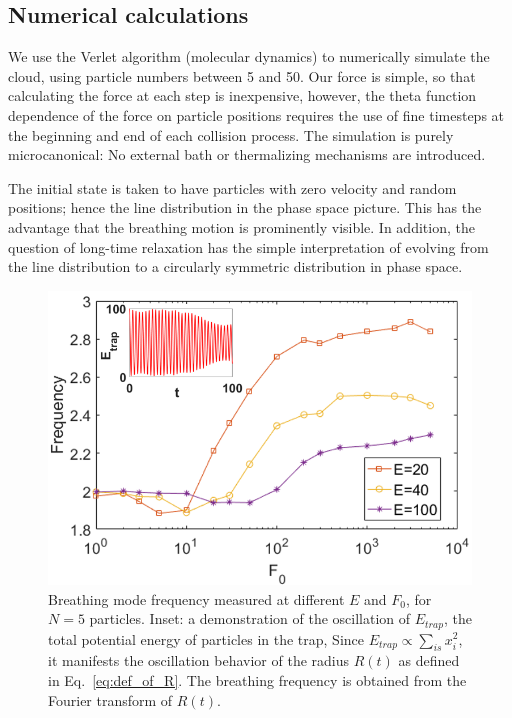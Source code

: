 \documentclass[a4paper, onecolumn]{revtex4-1}
\begin{document}
\subsection{Numerical calculations}

We use the Verlet algorithm (molecular dynamics) to numerically simulate the cloud, using particle
numbers between 5 and 50.  Our force is simple, so that calculating the force at each step is
inexpensive, however, the theta function dependence of the force on particle positions requires the
use of fine timesteps at the beginning and end of each collision process.  The simulation is purely
microcanonical: No external bath or thermalizing mechanisms are introduced. 

The initial state is taken to have particles with zero velocity and random positions; hence the line
distribution in the phase space picture.  This has the advantage that the breathing motion is
prominently visible.  In addition, the question of long-time relaxation has the simple
interpretation of evolving from the line distribution to a circularly symmetric distribution in
phase space.





\begin{figure}[tbp]
\center
\includegraphics[scale=0.32]{freq_scanF_differentE_log_2_with_oscillation_demo.png}
\caption{Breathing mode frequency measured at different $E$ and $F_0$, for $N=5$ particles. Inset: a
  demonstration of the oscillation of $E_{trap}$, the total potential energy of particles in the
  trap, Since $E_{trap}\propto \sum_{is}{x_i^2}$, it manifests the oscillation behavior of the
  radius $R(t)$ as defined in Eq.~\ref{eq:def_of_R}.  The breathing frequency is obtained from the
  Fourier transform of $R(t)$.}
\label{fig:Breathingfrequency1}
\end{figure}
\end{document}
